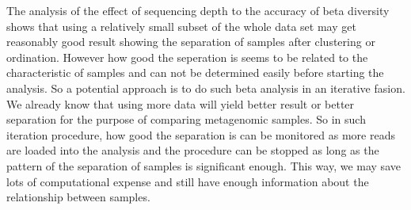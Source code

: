 The analysis of the effect of sequencing depth to the accuracy of beta
diversity shows that using a relatively small subset of the whole data set may
get reasonably good result showing the separation of samples after clustering
or ordination. However how good the seperation is seems to be related to the
characteristic of samples and can not be determined easily before starting the
analysis. So a potential approach is to do such beta analysis in an iterative
fasion. We already know that using more data will yield better result or better
separation for the purpose of comparing metagenomic samples. So in such
iteration procedure, how good the separation is can be monitored as more reads
are loaded into the analysis and the procedure can be stopped as long as the
pattern of the separation of samples is significant enough. This way, we may
save lots of computational expense and still have enough information about the
relationship between samples. 
 
    
    
    
    
    
    

